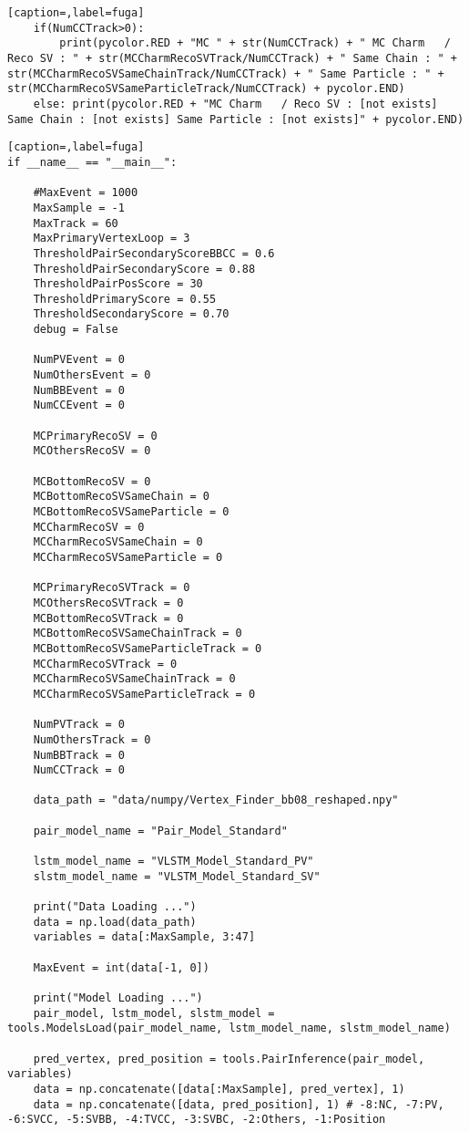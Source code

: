 \begin{lstlisting}[caption=,label=fuga]
    if(NumCCTrack>0):
        print(pycolor.RED + "MC " + str(NumCCTrack) + " MC Charm   / Reco SV : " + str(MCCharmRecoSVTrack/NumCCTrack) + " Same Chain : " + str(MCCharmRecoSVSameChainTrack/NumCCTrack) + " Same Particle : " + str(MCCharmRecoSVSameParticleTrack/NumCCTrack) + pycolor.END)
    else: print(pycolor.RED + "MC Charm   / Reco SV : [not exists] Same Chain : [not exists] Same Particle : [not exists]" + pycolor.END)
\end{lstlisting}

\begin{lstlisting}[caption=,label=fuga]
if __name__ == "__main__":

    #MaxEvent = 1000
    MaxSample = -1
    MaxTrack = 60
    MaxPrimaryVertexLoop = 3
    ThresholdPairSecondaryScoreBBCC = 0.6
    ThresholdPairSecondaryScore = 0.88
    ThresholdPairPosScore = 30
    ThresholdPrimaryScore = 0.55
    ThresholdSecondaryScore = 0.70
    debug = False

    NumPVEvent = 0
    NumOthersEvent = 0
    NumBBEvent = 0
    NumCCEvent = 0

    MCPrimaryRecoSV = 0
    MCOthersRecoSV = 0

    MCBottomRecoSV = 0
    MCBottomRecoSVSameChain = 0
    MCBottomRecoSVSameParticle = 0
    MCCharmRecoSV = 0
    MCCharmRecoSVSameChain = 0
    MCCharmRecoSVSameParticle = 0

    MCPrimaryRecoSVTrack = 0
    MCOthersRecoSVTrack = 0
    MCBottomRecoSVTrack = 0
    MCBottomRecoSVSameChainTrack = 0
    MCBottomRecoSVSameParticleTrack = 0
    MCCharmRecoSVTrack = 0
    MCCharmRecoSVSameChainTrack = 0
    MCCharmRecoSVSameParticleTrack = 0
    
    NumPVTrack = 0
    NumOthersTrack = 0 
    NumBBTrack = 0
    NumCCTrack = 0

    data_path = "data/numpy/Vertex_Finder_bb08_reshaped.npy"

    pair_model_name = "Pair_Model_Standard"

    lstm_model_name = "VLSTM_Model_Standard_PV"
    slstm_model_name = "VLSTM_Model_Standard_SV"

    print("Data Loading ...")
    data = np.load(data_path)
    variables = data[:MaxSample, 3:47]
    
    MaxEvent = int(data[-1, 0])

    print("Model Loading ...")
    pair_model, lstm_model, slstm_model = tools.ModelsLoad(pair_model_name, lstm_model_name, slstm_model_name)

    pred_vertex, pred_position = tools.PairInference(pair_model, variables)
    data = np.concatenate([data[:MaxSample], pred_vertex], 1)
    data = np.concatenate([data, pred_position], 1) # -8:NC, -7:PV, -6:SVCC, -5:SVBB, -4:TVCC, -3:SVBC, -2:Others, -1:Position


\end{lstlisting}
